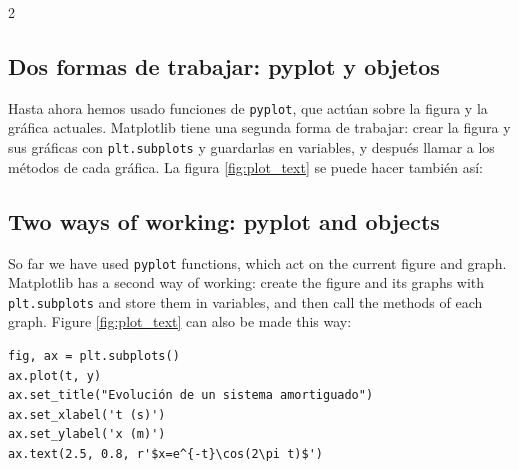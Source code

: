 \begin{paracol}{2}
\subsection{Dos formas de trabajar: pyplot y objetos}\label{sec:ax_interface}
Hasta ahora hemos usado funciones de \texttt{pyplot}, que actúan sobre la figura y la gráfica actuales. Matplotlib tiene una segunda forma de trabajar: crear la figura y sus gráficas con \texttt{plt.subplots} y guardarlas en variables, y después llamar a los métodos de cada gráfica. La figura \ref{fig:plot_text} se puede hacer también así:
\switchcolumn
\subsection{Two ways of working: pyplot and objects}\label{sec:ax_interface-2}
So far we have used \texttt{pyplot} functions, which act on the current figure and graph. Matplotlib has a second way of working: create the figure and its graphs with \texttt{plt.subplots} and store them in variables, and then call the methods of each graph. Figure \ref{fig:plot_text} can also be made this way:
\end{paracol}
\begin{verbatim}
fig, ax = plt.subplots()
ax.plot(t, y)
ax.set_title("Evolución de un sistema amortiguado")
ax.set_xlabel('t (s)')
ax.set_ylabel('x (m)')
ax.text(2.5, 0.8, r'$x=e^{-t}\cos(2\pi t)$')
\end{verbatim}

